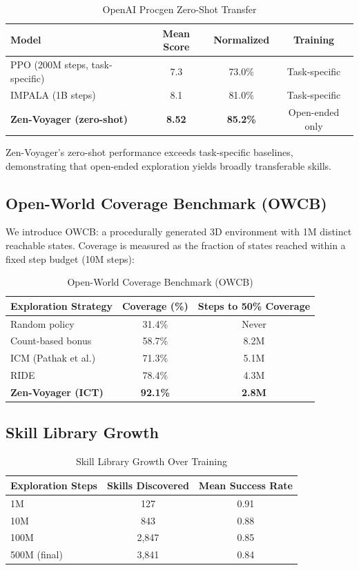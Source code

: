 \documentclass[11pt,a4paper]{article}
\begin{document}
\begin{table}[H]
\centering
\begin{tabular}{lccc}
\toprule
\textbf{Model} & \textbf{Mean Score} & \textbf{Normalized} & \textbf{Training} \\
\midrule
PPO (200M steps, task-specific) & 7.3 & 73.0\% & Task-specific \\
IMPALA (1B steps) & 8.1 & 81.0\% & Task-specific \\
\textbf{Zen-Voyager (zero-shot)} & \textbf{8.52} & \textbf{85.2\%} & Open-ended only \\
\bottomrule
\end{tabular}
\caption{OpenAI Procgen Zero-Shot Transfer}
\end{table}

Zen-Voyager's zero-shot performance exceeds task-specific baselines, demonstrating that
open-ended exploration yields broadly transferable skills.

\subsection{Open-World Coverage Benchmark (OWCB)}

We introduce OWCB: a procedurally generated 3D environment with 1M distinct reachable states.
Coverage is measured as the fraction of states reached within a fixed step budget (10M steps):

\begin{table}[H]
\centering
\begin{tabular}{lcc}
\toprule
\textbf{Exploration Strategy} & \textbf{Coverage (\%)} & \textbf{Steps to 50\% Coverage} \\
\midrule
Random policy & 31.4\% & Never \\
Count-based bonus & 58.7\% & 8.2M \\
ICM (Pathak et al.) & 71.3\% & 5.1M \\
RIDE & 78.4\% & 4.3M \\
\textbf{Zen-Voyager (ICT)} & \textbf{92.1\%} & \textbf{2.8M} \\
\bottomrule
\end{tabular}
\caption{Open-World Coverage Benchmark (OWCB)}
\end{table}

\subsection{Skill Library Growth}

\begin{table}[H]
\centering
\begin{tabular}{lcc}
\toprule
\textbf{Exploration Steps} & \textbf{Skills Discovered} & \textbf{Mean Success Rate} \\
\midrule
1M & 127 & 0.91 \\
10M & 843 & 0.88 \\
100M & 2,847 & 0.85 \\
500M (final) & 3,841 & 0.84 \\
\bottomrule
\end{tabular}
\caption{Skill Library Growth Over Training}
\end{table}
\end{document}

